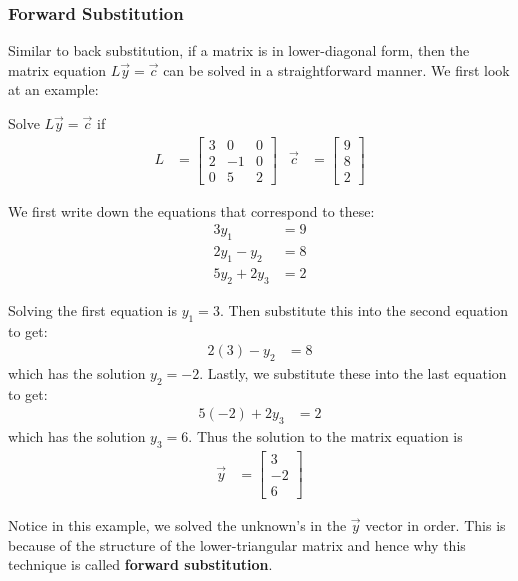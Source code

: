 \subsubsection{Forward Substitution}

Similar to back substitution, if a matrix is in lower-diagonal form, then the matrix equation $L\vec{y}=\vec{c}$ can be solved in a straightforward manner.  We first look at an example:

\begin{example}
Solve $L\vec{y}=\vec{c}$ if
\begin{align*}
L & = \begin{bmatrix}
3 & 0 & 0 \\
2 & -1 & 0 \\
0 & 5 & 2
\end{bmatrix} & \vec{c} & = \begin{bmatrix}
9 \\ 8 \\2 \end{bmatrix}
\end{align*}

We first write down the equations that correspond to these:
\begin{align*}
3y_1 & = 9 \\
2y_1-y_2 & = 8 \\
5y_2 + 2y_3 & = 2 
\end{align*}


Solving the first equation is $y_1=3$.  Then substitute this into the second equation to get:
\begin{align*}
2(3) - y_2 & = 8 
\end{align*}
which has the solution $y_2=-2$.  Lastly, we substitute these into the last equation to get:
\begin{align*}
5(-2) +2y_3 & = 2 
\end{align*}
which has the solution $y_3=6$.  Thus the solution to the matrix equation is 
\begin{align*}
\vec{y} & =\begin{bmatrix}
 3 \\ -2 \\ 6
\end{bmatrix}
\end{align*}

\end{example}

Notice in this example, we solved the unknown's in the $\vec{y}$ vector in order.  This is because of the structure of the lower-triangular matrix and hence why this technique is called \textbf{forward substitution}.  

